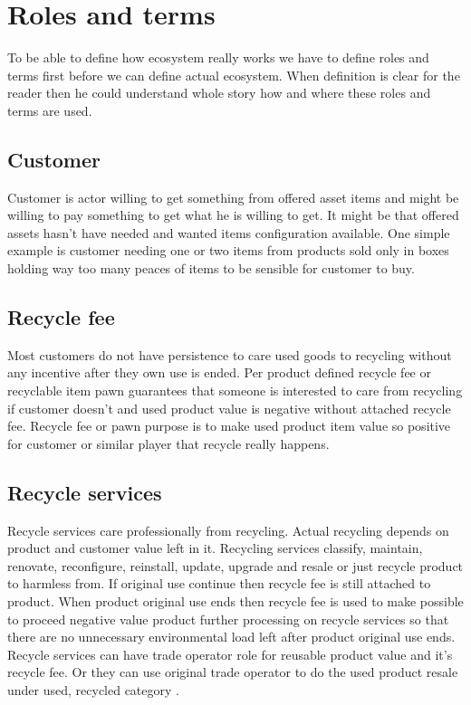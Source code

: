 \section{Roles and terms}\label{roles_and_terms}
To be able to define how ecosystem really works we have to define roles and
terms first before we can define actual ecosystem. When definition is clear
for the reader then he could understand whole story how and where these roles
and terms are used.

\subsection{Customer}\label{customer}
Customer is actor willing to get something from offered asset items and might
be willing to pay something to get what he is willing to get. It might be that
offered assets hasn't have needed and wanted items configuration available.
One simple example is customer needing one or two items from products sold
only in boxes holding way too many peaces of items to be sensible for customer
to buy.

\subsection{Recycle fee}\label{recycle_fee}
Most customers do not have persistence to care used goods to recycling without
any incentive after they own use is ended. Per product defined recycle fee or
recyclable item pawn guarantees that someone is interested to care from
recycling if customer doesn't and used product value is negative without
attached recycle fee. Recycle fee or pawn purpose is to make used product item
value so positive for customer or similar player that recycle really happens.

\subsection{Recycle services}\label{recycle_services}
Recycle services care professionally from recycling. Actual recycling depends
on product and customer value left in it. Recycling services classify,
maintain, renovate, reconfigure, reinstall, update, upgrade and resale or just
recycle product to harmless from. If original use continue then recycle fee is
still attached to product. When product original use ends then recycle fee is
used to make possible to proceed negative value product further processing on
recycle services so that there are no unnecessary environmental load left
after product original use ends. Recycle services can have trade operator role
for reusable product value and it's recycle fee. Or they can use original
trade operator to do the used product resale under used, recycled category
\allowbreak\cite{COMPO}.

